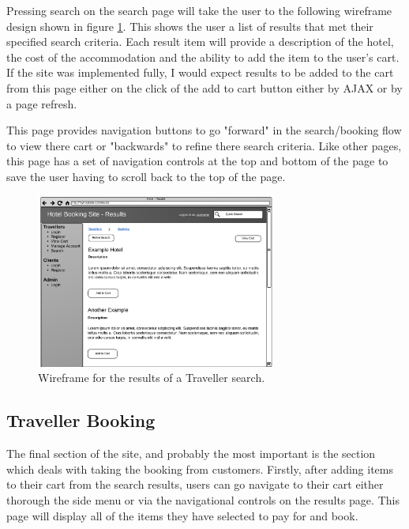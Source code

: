 \documentclass{article}
\begin{document}
Pressing search on the search page will take the user to the following wireframe design shown in figure \ref{fig:wireframe-traveller-results}. This shows the user a list of results that met their specified search criteria. Each result item will provide a description of the hotel, the cost of the accommodation and the ability to add the item to the user's cart. If the site was implemented fully, I would expect results to be added to the cart from this page either on the click of the add to cart button either by AJAX or by a page refresh. 

This page provides navigation buttons to go "forward" in the search/booking flow to view there cart or "backwards" to refine there search criteria. Like other pages, this page has a set of navigation controls at the top and bottom of the page to save the user having to scroll back to the top of the page.

\begin{figure}[H]
\centering
\includegraphics[width=0.7\textwidth]{img/wireframes/Results.png}
\caption{Wireframe for the results of a Traveller search.}
\label{fig:wireframe-traveller-results}
\end{figure}

\subsection{Traveller Booking}
The final section of the site, and probably the most important is the section which deals with taking the booking from customers. Firstly, after adding items to their cart from the search results, users can go navigate to their cart either thorough the side menu or via the navigational controls on the results page. This page will display all of the items they have selected to pay for and book. 
\end{document}
